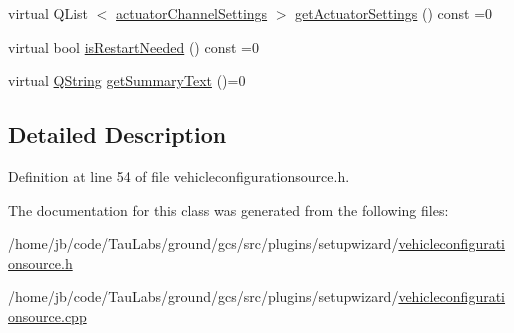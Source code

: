 \begin{DoxyCompactItemize}
\item 
virtual \-Q\-List\*
$<$ \hyperlink{structactuator_channel_settings}{actuator\-Channel\-Settings} $>$ \hyperlink{group___vehicle_configuration_source_ga21ab7c07bd3271df54d776b80b974a0f}{get\-Actuator\-Settings} () const =0
\item 
virtual bool \hyperlink{group___vehicle_configuration_source_ga53deeed450e4e532d976fde372be6a54}{is\-Restart\-Needed} () const =0
\item 
virtual \hyperlink{group___u_a_v_objects_plugin_gab9d252f49c333c94a72f97ce3105a32d}{\-Q\-String} \hyperlink{group___vehicle_configuration_source_ga1f54adbaeda45aac3778c52569dfa2f9}{get\-Summary\-Text} ()=0
\end{DoxyCompactItemize}


\subsection{\-Detailed \-Description}


\-Definition at line 54 of file vehicleconfigurationsource.\-h.



\-The documentation for this class was generated from the following files\-:\begin{DoxyCompactItemize}
\item 
/home/jb/code/\-Tau\-Labs/ground/gcs/src/plugins/setupwizard/\hyperlink{vehicleconfigurationsource_8h}{vehicleconfigurationsource.\-h}\item 
/home/jb/code/\-Tau\-Labs/ground/gcs/src/plugins/setupwizard/\hyperlink{vehicleconfigurationsource_8cpp}{vehicleconfigurationsource.\-cpp}\end{DoxyCompactItemize}
